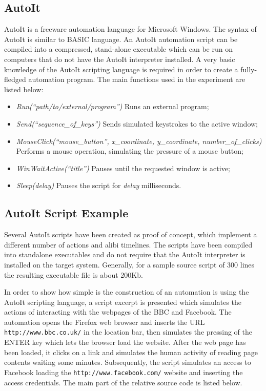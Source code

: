 \documentclass[runningheads]{llncs}
\begin{document}
\subsection{AutoIt}
AutoIt is a freeware automation language for Microsoft Windows.
The syntax of AutoIt is similar to BASIC language.
An AutoIt automation script can be compiled into a compressed, stand-alone
executable which can be run on computers that do not have the AutoIt interpreter installed.
A very basic knowledge of the AutoIt scripting language is required in order to create a fully-fledged automation program. The main functions used in the experiment are listed below:

\begin{itemize}
 \item \emph{Run(``path/to/external/program'')} Runs an external program;
 \item \emph{Send(``sequence\_of\_keys'')} Sends simulated keystrokes to the active window;
 \item \emph{MouseClick(``mouse\_button'', x\_coordinate, y\_coordinate, number\_of\_clicks)}\\ Performs a mouse operation, simulating the pressure of a mouse button; %
 \item \emph{WinWaitActive(``title'')} Pauses until the requested window is active;
 \item \emph{Sleep(delay)} Pauses the script for \textit{delay} milliseconds.
\end{itemize}

\subsection{AutoIt Script Example}
Several AutoIt scripts have been created as proof of concept, which implement a different number of actions and alibi timelines.
The scripts have been compiled into standalone executables and do not require that the AutoIt interpreter is installed on the target system.
Generally, for a sample source script of 300 lines the resulting executable file is about 200Kb.

In order to show how simple is the construction of an automation is using the AutoIt scripting language, a script excerpt is presented which simulates the actions of interacting with the webpages of the BBC and Facebook.
The automation opens the Firefox web browser and inserts the URL \verb=http://www.bbc.co.uk/= in the location bar, then simulates the pressing of the ENTER key which lets the browser load the website. After the web page has been loaded, it clicks on a link and simulates the human activity of reading page contents waiting some minutes. Subsequently, the script simulates an access to Facebook loading the \verb=http://www.facebook.com/= website and inserting the access credentials. The main part of the relative source code is listed below.
\bigskip
\end{document}
